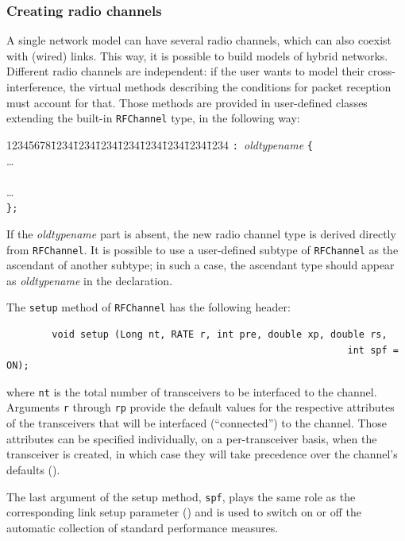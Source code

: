 \subsubsection{Creating radio channels}
\label{rm_to_rf_cr}

A single network model can have several radio channels,
which can also coexist with (wired) links.
This way, it is possible to build models of hybrid networks.
Different radio channels are independent: if the user wants to model their
cross-interference, the virtual methods describing the conditions for packet
reception must account for that.
Those methods are provided in user-defined classes extending the built-in
{\tt RFChannel} type, in the following way:

{\tt\begin{tabbing}
12345678\=1234\=1234\=1234\=1234\=1234\=1234\=1234\=1234\kill
{} {\tt : }{\em oldtypename\/} {\tt \{} \\
\> \>\ldots \\
\> \\
\> \>\ldots \\
\> {\tt \};}
\end{tabbing}}
\noindent
If the {\em oldtypename\/} part is absent,
the new radio channel type is derived directly from {\tt RFChannel}.
It is possible to use a user-defined subtype of {\tt RFChannel} as the
ascendant of
another subtype; in such a case, the ascendant type should appear as
{\em oldtypename\/} in the declaration.

The {\tt setup} method of {\tt RFChannel} has the following header:
\begin{verbatim}
        void setup (Long nt, RATE r, int pre, double xp, double rs,
                                                            int spf = ON);
\end{verbatim}
where {\tt nt} is the total number of transceivers to be interfaced to the
channel.
Arguments {\tt r} through {\tt rp} provide the default values for the
respective attributes of the transceivers that will be
interfaced (``connected'') to the channel.
Those attributes can be specified individually, on a per-transceiver
basis, when the transceiver is created, in which case they will take
precedence over the channel's defaults ().

The last argument of the setup method, {\tt spf},
plays the same role as the corresponding link setup
parameter ()
and is used to switch on or off the automatic collection of
standard performance measures.

